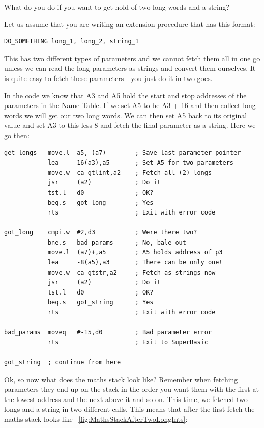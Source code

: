 What do you do if you want to get hold of two long words and a
      string?

Let us assume that you are writing an extension procedure that has this
      format:

\begin{lstlisting}[firstnumber=1,]
DO_SOMETHING long_1, long_2, string_1
\end{lstlisting}

This has two different types of parameters and we cannot fetch
      them all in one go unless we can read the long parameters as strings and
      convert them ourselves. It is quite easy to fetch these parameters -{} you
      just do it in two goes.

In the code we know that A3 and A5 hold the start and stop
      addresses of the parameters in the Name Table. If we set A5 to be A3 +
      16 and then collect long words we will get our two long words. We can
      then set A5 back to its original value and set A3 to this less 8 and
      fetch the final parameter as a string. Here we go then:

\begin{lstlisting}[firstnumber=1,caption={Fetching Mixed Type Parameters},label={lst:FetchingMixedTypeParameters}]
get_longs   move.l  a5,-(a7)        ; Save last parameter pointer
            lea     16(a3),a5       ; Set A5 for two parameters
            move.w  ca_gtlint,a2    ; Fetch all (2) longs
            jsr     (a2)            ; Do it
            tst.l   d0              ; OK?
            beq.s   got_long        ; Yes
            rts                     ; Exit with error code

got_long    cmpi.w  #2,d3           ; Were there two?
            bne.s   bad_params      ; No, bale out
            move.l  (a7)+,a5        ; A5 holds address of p3
            lea     -8(a5),a3       ; There can be only one!
            move.w  ca_gtstr,a2     ; Fetch as strings now
            jsr     (a2)            ; Do it
            tst.l   d0              ; OK?
            beq.s   got_string      ; Yes
            rts                     ; Exit with error code

bad_params  moveq   #-15,d0         ; Bad parameter error
            rts                     ; Exit to SuperBasic

got_string  ; continue from here
\end{lstlisting}

Ok, so now what does the maths stack look like? Remember when
      fetching parameters they end up on the stack in the order you want them
      with the first at the lowest address and the next above it and so on.
      This time, we fetched two longs and a string in two different calls.
      This means that after the first fetch the maths stack looks like  	    \figurename~\ref{fig:MathsStackAfterTwoLongInts}:


